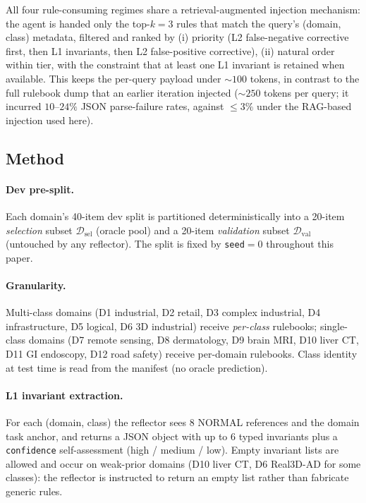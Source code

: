 All four rule-consuming regimes share a retrieval-augmented
injection mechanism: the agent is handed only the top-$k{=}3$ rules
that match the query's (domain, class) metadata, filtered and ranked
by (i) priority (L2 false-negative corrective first, then L1
invariants, then L2 false-positive corrective), (ii) natural order
within tier, with the constraint that at least one L1 invariant is
retained when available. This keeps the per-query payload under
$\sim 100$ tokens, in contrast to the full rulebook dump that an
earlier iteration injected ($\sim 250$ tokens per query; it incurred
$10$--$24\%$ JSON parse-failure rates, against $\le 3\%$ under the
RAG-based injection used here).

\subsection{Method}
\label{ssec:verb_method}

\paragraph{Dev pre-split.} Each domain's 40-item dev split is
partitioned deterministically into a 20-item \emph{selection} subset
$\mathcal{D}_{\mathrm{sel}}$ (oracle pool) and a 20-item
\emph{validation} subset $\mathcal{D}_{\mathrm{val}}$ (untouched by
any reflector). The split is fixed by \texttt{seed}$=0$ throughout
this paper.

\paragraph{Granularity.} Multi-class domains (D1 industrial,
D2 retail, D3 complex industrial, D4 infrastructure,
D5 logical, D6 3D industrial) receive \emph{per-class}
rulebooks; single-class domains (D7 remote sensing, D8 dermatology,
D9 brain MRI, D10 liver CT, D11 GI endoscopy, D12 road safety) receive
per-domain rulebooks. Class identity at test time is read from the
manifest (no oracle prediction).

\paragraph{L1 invariant extraction.} For each (domain, class) the
reflector sees $8$ NORMAL references and the domain task anchor, and
returns a JSON object with up to $6$ typed invariants plus a
\texttt{confidence} self-assessment (high / medium / low). Empty
invariant lists are allowed and occur on weak-prior domains (D10
liver CT, D6 Real3D-AD for some classes): the reflector is
instructed to return an empty list rather than fabricate generic
rules.

